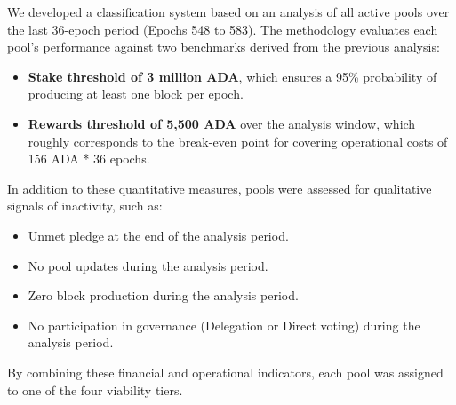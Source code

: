 \documentclass[11pt, letterpaper]{article}
\begin{document}
We developed a classification system based on an analysis of all active pools
over the last 36-epoch period (Epochs 548 to 583). The methodology evaluates
each pool's performance against two benchmarks derived from the previous
analysis:

\begin{itemize}
	\item \textbf{Stake threshold of 3 million ADA}, which ensures a 95\% probability of producing at least
	      one block per epoch.
	\item \textbf{Rewards threshold of 5,500 ADA} over the analysis window, which roughly corresponds to the break-even
	      point for covering operational costs of 156 ADA * 36 epochs.
\end{itemize}

In addition to these quantitative measures, pools were assessed for qualitative
signals of inactivity, such as:

\begin{itemize}
	\item Unmet pledge at the end of the analysis period.
	\item No pool updates during the analysis period.
	\item Zero block production during the analysis period.
	\item No participation in governance (Delegation or Direct voting) during the
	      analysis period.
\end{itemize}

By combining these financial and operational indicators, each pool was assigned
to one of the four viability tiers.
\end{document}
